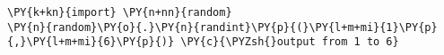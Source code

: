 \begin{Verbatim}[commandchars=\\\{\}]
\PY{k+kn}{import} \PY{n+nn}{random}
\PY{n}{random}\PY{o}{.}\PY{n}{randint}\PY{p}{(}\PY{l+m+mi}{1}\PY{p}{,}\PY{l+m+mi}{6}\PY{p}{)} \PY{c}{\PYZsh{}output from 1 to 6}
\end{Verbatim}

